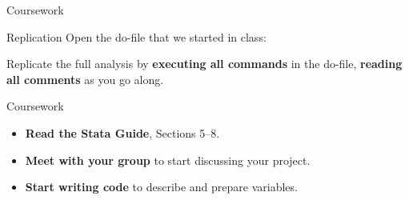 \documentclass[t]{beamer}
\begin{document}
	 \begin{frame}[t]{Coursework }

    \begin{block}{Replication}
			Open the do-file that we started in class:
			\begin{center}
			\end{center}

      Replicate the full analysis by \textbf{executing all commands} in the do-file, \textbf{reading all comments} as you go along.%
    \end{block}

    \begin{alertblock}{Coursework}
      \begin{itemize}
	       \item \textbf{Read the Stata Guide}, Sections 5--8.
	       \item \textbf{Meet with your group} to start discussing your project.
	       \item \textbf{Start writing code} to describe and prepare variables.
      \end{itemize}
    \end{alertblock}
    		
	\end{frame}
  
\end{document}
